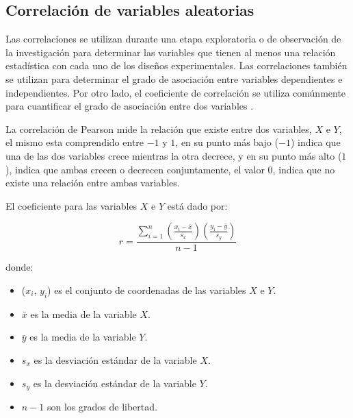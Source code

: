 %

\subsection{Correlación de variables aleatorias}
\label{sec:correlacion}

Las correlaciones se utilizan durante una etapa exploratoria o de observación de
la investigación para determinar las variables que tienen al menos una relación
estadística con cada uno de los diseños experimentales. Las correlaciones
también se utilizan para determinar el grado de asociación entre variables
dependientes e independientes. Por otro lado, el coeficiente de correlación se
utiliza comúnmente para cuantificar el grado de asociación entre dos variables
\cite{BoslaughStatistics2008}.

La correlación de Pearson\cite{BoslaughStatistics2008} mide la relación que
existe entre dos variables, $X$ e $Y$, el mismo esta comprendido entre $-1$ y
$1$, en su punto más bajo ($-1$) indica que una de las dos variables crece mientras
la otra decrece, y en su punto más alto ($1$), indica que ambas crecen o
decrecen conjuntamente, el valor $0$, indica que no existe una relación entre
ambas variables.

El coeficiente para las variables $X$ e $Y$ está dado por:

\begin{equation}
r = \frac{\sum_{i=1}^n{(\frac{x_i-\bar{x}}{s_x})({\frac{y_i-\bar{y}}{s_y}})}}%
{n - 1}
\end{equation}

donde:

\begin{itemize}
    \item ($x_i$, $y_i$) es el conjunto de coordenadas de las variables $X$ e $Y$.
    \item $\bar{x}$ es la media de la variable $X$.
    \item $\bar{y}$ es la media de la variable $Y$.
    \item $s_x$ es la desviación estándar de la variable $X$.
    \item $s_y$ es la desviación estándar de la variable $Y$.
    \item $n - 1$ son los grados de libertad.
\end{itemize}
